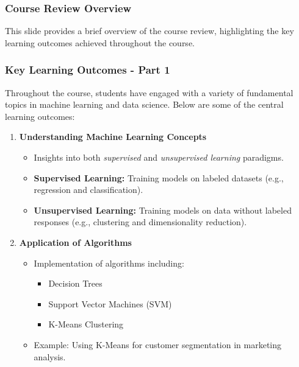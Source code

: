 \documentclass[aspectratio=169]{beamer}
\begin{document}
\frame{\titlepage}

\begin{frame}[fragile]
    \frametitle{Course Review Overview}
    This slide provides a brief overview of the course review, highlighting the key learning outcomes achieved throughout the course.
\end{frame}

\begin{frame}[fragile]
    \frametitle{Key Learning Outcomes - Part 1}
    Throughout the course, students have engaged with a variety of fundamental topics in machine learning and data science. Below are some of the central learning outcomes:
    
    \begin{enumerate}
        \item \textbf{Understanding Machine Learning Concepts}
        \begin{itemize}
            \item Insights into both \textit{supervised} and \textit{unsupervised learning} paradigms.
            \item \textbf{Supervised Learning:} Training models on labeled datasets (e.g., regression and classification).
            \item \textbf{Unsupervised Learning:} Training models on data without labeled responses (e.g., clustering and dimensionality reduction).
        \end{itemize}
        
        \item \textbf{Application of Algorithms}
        \begin{itemize}
            \item Implementation of algorithms including:
                \begin{itemize}
                    \item Decision Trees
                    \item Support Vector Machines (SVM)
                    \item K-Means Clustering
                \end{itemize}
            \item Example: Using K-Means for customer segmentation in marketing analysis.
        \end{itemize}
    \end{enumerate}
\end{frame}
\end{document}
